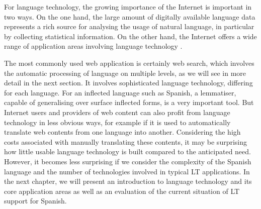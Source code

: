 \begin{multicols}{2}
For language technology, the growing importance of the Internet is important in two ways. On the one hand, the large amount of digitally available language data represents a rich source for analysing the usage of natural language, in particular by collecting statistical information. On the other hand, the Internet offers a wide range of application areas involving language technology \cite{lenguatec}.

The most commonly used web application is certainly web search, which involves the automatic processing of language on multiple levels, as we will see in more detail in the next section. It involves sophisticated language technology, differing for each language. For an inflected language such as Spanish, a lemmatiser, capable of generalising over surface inflected forms, is a very important tool. But Internet users and providers of web content can also profit from language technology in less obvious ways, for example if it is used to automatically translate web contents from one language into another. Considering the high costs associated with manually translating these contents, it may be surprising how little usable language technology is built compared to the anticipated need. However, it becomes less surprising if we consider the complexity of the Spanish language and the number of technologies involved in typical LT applications. In the next chapter, we will present an introduction to language technology and its core application areas as well as an evaluation of the current situation of LT support for Spanish. 

\end{multicols}

\clearpage



